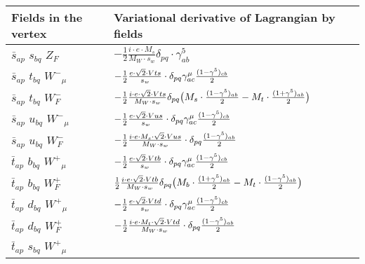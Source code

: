 \begin{center}
\begin{tabular}{|l|l|} \hline
Fields in the vertex & Variational derivative of Lagrangian by fields \\ \hline
$\bar{s}{}_{a p }$ \phantom{-} $s{}_{b q }$ \phantom{-} $Z_F{}_{}$ \phantom{-}  &
	$-\frac{1}{2}\frac{ i \cdot e \cdot M_s}{ M_W \cdot s_w}\delta_{p q} \cdot \gamma_{a b}^5 $\\[2mm]
$\bar{s}{}_{a p }$ \phantom{-} $t{}_{b q }$ \phantom{-} $W^-{}_{\mu }$ \phantom{-}  &
	$-\frac{1}{2}\frac{ e \cdot\sqrt{2} \cdot Vts}{ s_w}\cdot \delta_{p q} \gamma_{a c}^\mu {(1-\gamma^5)_{c b}\over 2} $\\[2mm]
$\bar{s}{}_{a p }$ \phantom{-} $t{}_{b q }$ \phantom{-} $W^-_F{}_{}$ \phantom{-}  &
	$-\frac{1}{2}\frac{ i \cdot e \cdot\sqrt{2} \cdot Vts}{ M_W \cdot s_w}\delta_{p q} \big( M_s\cdot {(1-\gamma^5)_{a b}\over 2} - M_t\cdot {(1+\gamma^5)_{a b}\over 2} \big)$\\[2mm]
$\bar{s}{}_{a p }$ \phantom{-} $u{}_{b q }$ \phantom{-} $W^-{}_{\mu }$ \phantom{-}  &
	$-\frac{1}{2}\frac{ e \cdot\sqrt{2} \cdot Vus}{ s_w}\cdot \delta_{p q} \gamma_{a c}^\mu {(1-\gamma^5)_{c b}\over 2} $\\[2mm]
$\bar{s}{}_{a p }$ \phantom{-} $u{}_{b q }$ \phantom{-} $W^-_F{}_{}$ \phantom{-}  &
	$-\frac{1}{2}\frac{ i \cdot e \cdot M_s \cdot\sqrt{2} \cdot Vus}{ M_W \cdot s_w}\cdot \delta_{p q} {(1-\gamma^5)_{a b}\over 2} $\\[2mm]
$\bar{t}{}_{a p }$ \phantom{-} $b{}_{b q }$ \phantom{-} $W^+{}_{\mu }$ \phantom{-}  &
	$-\frac{1}{2}\frac{ e \cdot\sqrt{2} \cdot Vtb}{ s_w}\cdot \delta_{p q} \gamma_{a c}^\mu {(1-\gamma^5)_{c b}\over 2} $\\[2mm]
$\bar{t}{}_{a p }$ \phantom{-} $b{}_{b q }$ \phantom{-} $W^+_F{}_{}$ \phantom{-}  &
	$\frac{1}{2}\frac{ i \cdot e \cdot\sqrt{2} \cdot Vtb}{ M_W \cdot s_w}\delta_{p q} \big( M_b\cdot {(1+\gamma^5)_{a b}\over 2} - M_t\cdot {(1-\gamma^5)_{a b}\over 2} \big)$\\[2mm]
$\bar{t}{}_{a p }$ \phantom{-} $d{}_{b q }$ \phantom{-} $W^+{}_{\mu }$ \phantom{-}  &
	$-\frac{1}{2}\frac{ e \cdot\sqrt{2} \cdot Vtd}{ s_w}\cdot \delta_{p q} \gamma_{a c}^\mu {(1-\gamma^5)_{c b}\over 2} $\\[2mm]
$\bar{t}{}_{a p }$ \phantom{-} $d{}_{b q }$ \phantom{-} $W^+_F{}_{}$ \phantom{-}  &
	$-\frac{1}{2}\frac{ i \cdot e \cdot M_t \cdot\sqrt{2} \cdot Vtd}{ M_W \cdot s_w}\cdot \delta_{p q} {(1-\gamma^5)_{a b}\over 2} $\\[2mm]
$\bar{t}{}_{a p }$ \phantom{-} $s{}_{b q }$ \phantom{-} $W^+{}_{\mu }$ \phantom{-}  &

\end{tabular}
\end{center}

